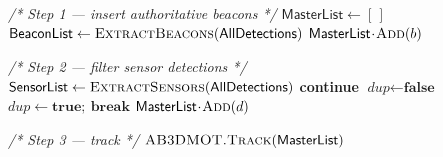 \begin{algorithm}[t]
\footnotesize                      
\caption{Edge Data Fusion with Self-Beacon Anchoring}
\label{alg:edge_preprocess}
\begin{algorithmic}[1]

  \Statex                                     %
  \Statex\textit{/* Step 1 — insert authoritative beacons */}
  \State $\mathsf{MasterList} \gets [\,]$
  \State $\mathsf{BeaconList} \gets \textsc{ExtractBeacons}(\mathsf{AllDetections})$
      \State $\mathsf{MasterList}\!\cdot\!\textsc{Add}(b)$
  \EndFor

  \Statex                                     %
  \Statex\textit{/* Step 2 — filter sensor detections */}
  \State $\mathsf{SensorList} \gets \textsc{ExtractSensors}(\mathsf{AllDetections})$
          \State \textbf{continue}
      \EndIf
      \State $\textit{dup} \gets \textbf{false}$
              \State $\textit{dup} \gets \textbf{true};\ \textbf{break}$
          \EndIf
      \EndFor
          \State $\mathsf{MasterList}\!\cdot\!\textsc{Add}(d)$
      \EndIf
  \EndFor

  \Statex                                     %
  \Statex\textit{/* Step 3 — track */}
  \State \Return $\textsc{AB3DMOT.Track}(\mathsf{MasterList})$
\EndProcedure
\end{algorithmic}
\vspace{3mm}
\end{algorithm}